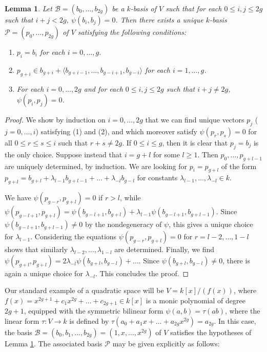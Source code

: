 \documentclass{article} %
\newtheorem{lemma}[proposition]{Lemma}
\numberwithin{equation}{section}
\begin{document}
\begin{lemma}\label{lem_straightening_basis}
    Let $\mathcal{B} = (b_0, \dots, b_{2g})$ be a $k$-basis of $V$ such that for each $0 \leq i, j \leq 2g$ such that $i+j < 2g$, $\psi(b_i, b_j) = 0$. Then there exists a unique $k$-basis $\mathcal{P} = (p_0, \dots, p_{2g})$ of $V$ satisfying the following conditions:
    \begin{enumerate}
        \item $p_i = b_i$ for each $i = 0, \dots, g$.
        \item $p_{g+i} \in b_{g+i} + \langle b_{g+i-1}, \dots, b_{g-i+1}, b_{g-i} \rangle$ for each $i = 1, \dots, g$.
        \item For each $i = 0, \dots, 2g$ and for each $0 \leq i, j \leq 2g$ such that $i +j \neq 2g$, $\psi(p_i, p_j) = 0$.
    \end{enumerate}
\end{lemma}
\begin{proof}
    We show by induction on $i = 0, \dots, 2g$ that we can find unique vectors $p_j$ ($j = 0, \dots, i$) satisfying (1) and (2), and which moreover satisfy $\psi(p_r, p_s) = 0$ for all $0 \leq r \leq s \leq i$ such that $r + s \neq 2g$. If $0 \leq i \leq g$, then it is clear that $p_j = b_j$ is the only choice. Suppose instead that $i = g + l$ for some $l \geq 1$. Then $p_0, \dots, p_{g+{l-1}}$ are uniquely determined, by induction. We are looking for $p_i = p_{g+l}$ of the form $p_{g+l} = b_{g+l} + \lambda_{l-1} b_{g+{l-1}} + \dots + \lambda_{-l} b_{g-l}$ for constants $\lambda_{l-1}, \dots, \lambda_{-l} \in k$. 

    We have $\psi(p_{g-r}, p_{g+l}) = 0$ if $r > l$, while $\psi(p_{g-l+1}, p_{g+l}) = \psi(b_{g-l+1}, b_{g+l}) + \lambda_{l-1} \psi(b_{g-l+1}, b_{g+l-1})$. Since $\psi(b_{g-l+1}, b_{g+l-1}) \neq 0$ by the nondegeneracy of $\psi$, this gives a unique choice for $\lambda_{l-1}$. Considering the equations $\psi(p_{g-r}, p_{g+l}) = 0$ for $r = l-2, \dots, 1-l$ shows that similarly $\lambda_{l-2}, \dots, \lambda_{1-l}$ are determined. Finally, we find $\psi(p_{g+l}, p_{g+l}) = 2 \lambda_{-l} \psi(b_{g+l}, b_{g-l}) + \dots$. Since $\psi(b_{g+l}, b_{g-l}) \neq 0$, there is again a unique choice for $\lambda_{-l}$. This concludes the proof. 
\end{proof}
Our standard example of a quadratic space will be $V = k[x] / (f(x))$, where $f(x) = x^{2g+1} + c_1 x^{2g} + \dots + c_{2g+1} \in k[x]$ is a monic polynomial of degree $2g+1$, equipped with the symmetric bilinear form $\psi(a, b) = \tau(ab)$, where the linear form $\tau : V \to k$ is defined by $\tau(a_0 + a_1 x + \dots + a_{2g} x^{2g}) = a_{2g}$. In this case, the basis $\mathcal{B} = (b_0, b_1, \dots, b_{2g}) = (1, x, \dots, x^{2g})$ of $V$ satisfies the hypotheses of Lemma \ref{lem_straightening_basis}. The associated basis $\mathcal{P}$ may be given explicitly as follows:
\end{document}
